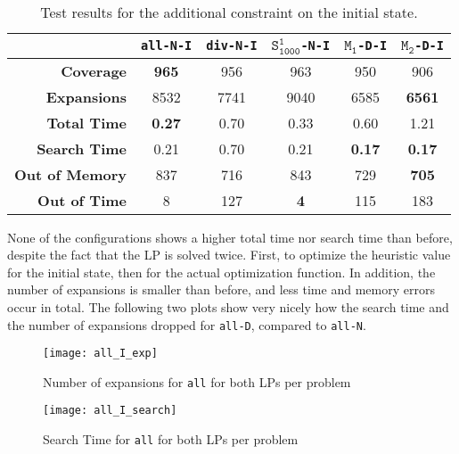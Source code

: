 \begin{table}[h!]
    \begin{center}
        \begin{tabular}{|r|c|c|c|c|c|}
            \hline
            & \textbf{\texttt{all-N-I}} & \textbf{\texttt{div-N-I}} & \textbf{$\texttt{S}_\texttt{1000}^\texttt{1}$\texttt{-N-I}} & \textbf{$\texttt{M}_\texttt{1}$\texttt{-D-I}} & \textbf{$\texttt{M}_\texttt{2}$\texttt{-D-I}} \\
            \hline \hline
            \textbf{Coverage}       & \textbf{965}  & 956   & 963       & 950           & 906 \\ \hline
            \textbf{Expansions}     & 8532          & 7741  & 9040      & 6585          & \textbf{6561} \\ \hline
            \textbf{Total Time}     & \textbf{0.27} & 0.70  & 0.33      & 0.60          & 1.21 \\ \hline
            \textbf{Search Time}    & 0.21          & 0.70  & 0.21      & \textbf{0.17} & \textbf{0.17} \\ \hline
            \textbf{Out of Memory}  & 837           & 716   & 843       & 729           & \textbf{705} \\ \hline
            \textbf{Out of Time}    & 8             & 127   & \textbf{4}& 115           & 183 \\ \hline
        \end{tabular}
        \caption{Test results for the additional constraint on the initial state.}
        \label{table:initial-constraint}
    \end{center}
\end{table}

None of the configurations shows a higher total time nor search time than before, despite the fact that the LP is solved twice.
First, to optimize the heuristic value for the initial state, then for the actual optimization function.
In addition, the number of expansions is smaller than before, and less time and memory errors occur in total.
The following two plots show very nicely how the search time and the number of expansions dropped for \texttt{all-D}, compared to \texttt{all-N}.

\begin{figure}[h!]
\centering
    \texttt{[image: all\_I\_exp]}
    \caption{Number of expansions for \texttt{all} for both LPs per problem}
\end{figure}

\begin{figure}[h!]
\centering
    \texttt{[image: all\_I\_search]}
    \caption{Search Time  for \texttt{all} for both LPs per problem}
\end{figure}

